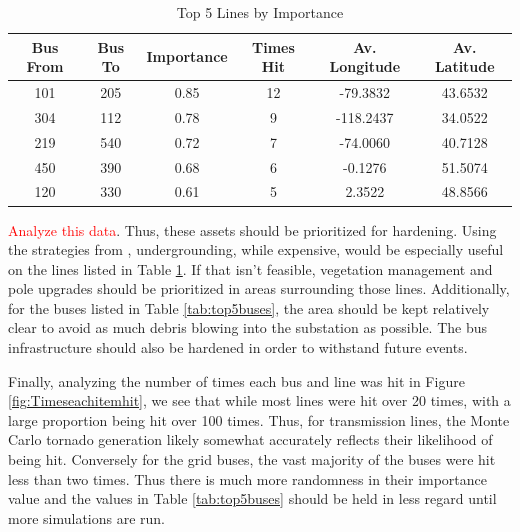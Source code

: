 \documentclass[12pt]{article}
\begin{document}
\begin{table}[ht]
    \centering
    \begin{tabular}{cccccc}
        \toprule
        Bus From & Bus To & Importance & Times Hit & Av. Longitude & Av. Latitude \\
        \midrule
        101 & 205 & 0.85 & 12 & -79.3832 & 43.6532 \\
        304 & 112 & 0.78 & 9  & -118.2437 & 34.0522 \\
        219 & 540 & 0.72 & 7  & -74.0060 & 40.7128 \\
        450 & 390 & 0.68 & 6  & -0.1276 & 51.5074 \\
        120 & 330 & 0.61 & 5  & 2.3522 & 48.8566 \\
        \bottomrule
    \end{tabular}
    \caption{Top 5 Lines by Importance}
    \label{tab:top5lines}
\end{table}

\textcolor{red}{Analyze this data}. Thus, these assets should be prioritized for hardening. Using the strategies from \cite{hughes2024assessing}, undergrounding, while expensive, would be especially useful on the lines listed in Table \ref{tab:top5lines}. If that isn't feasible, vegetation management and pole upgrades should be prioritized in areas surrounding those lines. Additionally, for the buses listed in Table \ref{tab:top5buses}, the area should be kept relatively clear to avoid as much debris blowing into the substation as possible. The bus infrastructure should also be hardened in order to withstand future events. 


Finally, analyzing the number of times each bus and line was hit in Figure \ref{fig:Timeseachitemhit}, we see that while most lines were hit over 20 times, with a large proportion being hit over 100 times. Thus, for transmission lines, the Monte Carlo tornado generation likely somewhat accurately reflects their likelihood of being hit. Conversely for the grid buses, the vast majority of the buses were hit less than two times. Thus there is much more randomness in their importance value and the values in Table \ref{tab:top5buses} should be held in less regard until more simulations are run.
\end{document}
